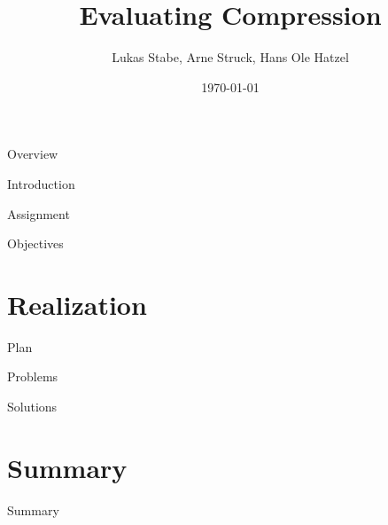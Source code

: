 \documentclass[10pt, compress]{beamer}
\title{Evaluating Compression}
\date{\today}
\author{Lukas Stabe, Arne Struck, Hans Ole Hatzel}
\begin{document}
\maketitle
\begin{frame}{Overview}
    \tableofcontents
\end{frame}


\begin{frame}{Introduction}
\end{frame}

\begin{frame}{Assignment}
\end{frame}

\begin{frame}{Objectives}
\end{frame}

\section{Realization}
\begin{frame}{Plan}
\end{frame}

\begin{frame}{Problems}
\end{frame}

\begin{frame}{Solutions}

\end{frame}

\section{Summary}
\begin{frame}{Summary}
\end{frame}
\end{document}
